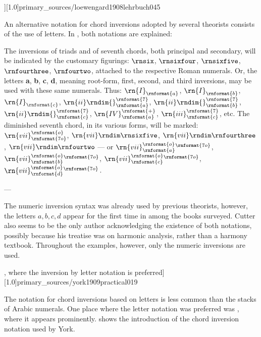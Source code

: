 \phdfigure[Missing first inversion of the $\rn{ii}\rnsix$
chord (measure 6) in
\textcite[p.~45]{loewengard1908lehrbuch}][1.0]{primary_sources/loewengard1908lehrbuch045}

An alternative notation for chord inversions adopted by
several theorists consists of the use of letters. In
\textcite{cutter1902harmonic}, both notations are explained:

\begin{italicquotes}
    The inversions of triads and of seventh chords, both
    principal and secondary, will be indicated by the
    customary figurings: $\rnsix$, $\rnsixfour$,
    $\rnsixfive$, $\rnfourthree$, $\rnfourtwo$, attached to
    the respective Roman numerals. Or, the letters
    \textbf{a}, \textbf{b}, \textbf{c}, \textbf{d}, meaning
    root-form, first, second, and third inversions, may be
    used with these same numerals. Thus:
    $\rn{I}_\rnformat{a}$, $\rn{I}_\rnformat{b}$,
    $\rn{I}_\rnformat{c}$,
    $\rn{ii}\rndim{}^\rnformat{7}_\rnformat{a}$,
    $\rn{ii}\rndim{}^\rnformat{7}_\rnformat{b}$,
    $\rn{ii}\rndim{}^\rnformat{7}_\rnformat{c}$,
    $\rn{IV}^\rnformat{+}_\rnformat{a}$,
    $\rn{iii}^\rnformat{7}_\rnformat{c}$, etc. The
    diminished seventh chord, in its various forms, will be
    marked: $\rn{vii}^\rnformat{o}_\rnformat{7o}$,
    $\rn{vii}\rndim\rnsixfive$,
    $\rn{vii}\rndim\rnfourthree$, $\rn{vii}\rndim\rnfourtwo$
    --- or
    $\rn{vii}^{\rnformat{o}}_{\rnformat{a}}{}^\rnformat{7o}$,
    $\rn{vii}^{\rnformat{o}}_{\rnformat{b}}{}^\rnformat{7o}$,
    $\rn{vii}^{\rnformat{o}}_{\rnformat{c}}{}^\rnformat{7o}$,
    $\rn{vii}^{\rnformat{o}}_{\rnformat{d}}{}^\rnformat{7o}$.

    --- \emph{\textcite[p.~4]{cutter1902harmonic}}
\end{italicquotes}

The numeric inversion syntax was already used by previous
theorists, however, the letters ${a, b, c , d}$ appear for
the first time in \textcite{cutter1902harmonic} among the
books surveyed. Cutter also seems to be the only author
acknowledging the existence of both notations, possibly
because his treatise was on harmonic analysis, rather than a
harmony textbook. Throughout the examples, however, only the
numeric inversions are used.


\phdfigure[\textcite[p.~19]{york1909practical}, where the
inversion by letter notation is
preferred][1.0]{primary_sources/york1909practical019}

The notation for chord inversions based on letters is less
common than the stacks of Arabic numerals. One place where
the letter notation was preferred was
\textcite{york1909practical}, where it appears prominently.
 shows the
introduction of the chord inversion notation used by York.
